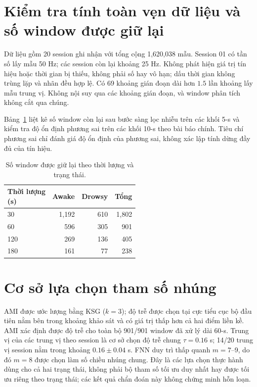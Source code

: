 \documentclass[conference,a4paper]{IEEEtran}
\begin{document}

\renewcommand{\tablename}{Bảng}
\renewcommand{\figurename}{Hình}
\section{Kiểm tra tính toàn vẹn dữ liệu và số window được giữ lại}\label{sec:supp_1}
Dữ liệu gồm 20 session ghi nhận với tổng cộng 1,620,038 mẫu. Session 01 có tần số lấy mẫu 50 Hz; các session còn lại khoảng 25 Hz. Không phát hiện giá trị tín hiệu hoặc thời gian bị thiếu, không phải số hay vô hạn; dấu thời gian không trùng lặp và nhãn đều hợp lệ. Có 69 khoảng gián đoạn dài hơn $1.5$ lần khoảng lấy mẫu trung vị. Không nội suy qua các khoảng gián đoạn, và window phân tích không cắt qua chúng.

Bảng~\ref{tab:supp_retained} liệt kê số window còn lại sau bước sàng lọc nhiễu trên các khối 5-s và kiểm tra độ ổn định phương sai trên các khối 10-s theo bài báo chính. Tiêu chí phương sai chỉ đánh giá độ ổn định của phương sai, không xác lập tính dừng đầy đủ của tín hiệu.

\begin{table}[t]
\centering
\caption{Số window được giữ lại theo thời lượng và trạng thái.}\label{tab:supp_retained}
\footnotesize
\setlength{\tabcolsep}{3pt}
\renewcommand{\arraystretch}{1.05}
\begin{tabular*}{\linewidth}{@{\extracolsep{\fill}}lrrr@{}}
\toprule
\makecell{Thời lượng\\(s)} & Awake & Drowsy & Tổng\\
\midrule
30 & 1,192 & 610 & 1,802\\
60 & 596 & 305 & 901\\
120 & 269 & 136 & 405\\
180 & 161 & 77 & 238\\
\bottomrule
\end{tabular*}
\end{table}
\section{Cơ sở lựa chọn tham số nhúng}\label{sec:supp_2}
AMI được ước lượng bằng KSG ($k=3$); độ trễ được chọn tại cực tiểu cục bộ đầu tiên nằm bên trong khoảng khảo sát và có giá trị thấp hơn cả hai điểm liền kề. AMI xác định được độ trễ cho toàn bộ 901/901 window đã xử lý dài 60-s. Trung vị của các trung vị theo session là cơ sở chọn độ trễ chung $\tau=0.16$ s; 14/20 trung vị session nằm trong khoảng $0.16\pm0.04$ s. FNN duy trì thấp quanh $m=7$--9, do đó $m=8$ được chọn làm số chiều nhúng chung. Đây là các lựa chọn thực hành dùng cho cả hai trạng thái, không phải bộ tham số tối ưu duy nhất hay được tối ưu riêng theo trạng thái; các kết quả chẩn đoán này không chứng minh hỗn loạn.
\end{document}
